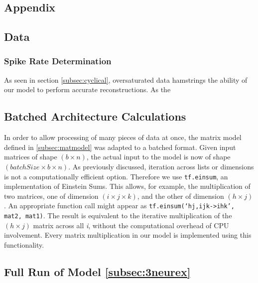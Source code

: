 \begin{appendices}
	\chapter{Appendix}
	\section{Data}
	\subsection{Spike Rate Determination}
	As seen in section \ref{subsec:cyclical}, oversaturated data hamstrings the 
	ability of our model to perform accurate reconstructions. As the 

	\section{Batched Architecture Calculations}
	\label{asec:batched}
	In order to allow processing of many pieces of data at once, the matrix 
	model defined in \ref{subsec:matmodel} was adapted to a batched format.  
	Given input matrices of shape $(b \times n)$, the actual input to the model 
	is now of shape $(batchSize \times b \times n)$. As previously discussed, 
	iteration across lists or dimensions is not a computationally efficient 
	option. Therefore we use \texttt{tf.einsum}, an implementation of Einstein 
	Sums. This allows, for example, the multiplication of two matrices, one of 
	dimension $(i \times j \times k)$, and the other of dimension $(h \times 
	j)$. An appropriate function call might appear as
	\texttt{tf.einsum(`hj,ijk->ihk', mat2, mat1)}. The result is equivalent to 
	the iterative multiplication of the $(h \times j)$ matrix across all 
	\textit{i}, without the computational overhead of CPU involvement. Every 
	matrix multiplication in our model is implemented using this functionality.

	\section{Full Run of Model \ref{subsec:3neurex}}
	\label{asec:fullrun}

\end{appendices}
